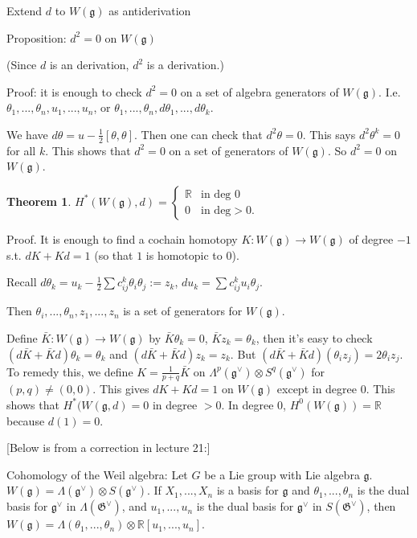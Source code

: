 \documentclass{article}
\theoremstyle{mystyle}
\newtheorem*{theorem*}{Theorem}
\theoremstyle{remark}
\numberwithin{equation}{section}
\begin{document}
Extend $d$ to $W(\mathfrak{g})$ as antiderivation

Proposition: $d^2=0$ on $W(\mathfrak{g})$

(Since $d$ is an derivation, $d^2$ is a derivation.)

Proof: it is enough to check $d^2=0$ on a set of algebra generators of $W(\mathfrak{g})$. I.e. $\theta_1,...,\theta_n,u_1,...,u_n$, or $\theta_1,...,\theta_n,d\theta_1,...,d\theta_k$. 

We have $d\theta = u - \frac{1}{2}[\theta,\theta]$. Then one can check that $d^2\theta = 0$. This says $d^2\theta^k=0$ for all $k$. This shows that $d^2 =0$ on a set of generators of $W(\mathfrak{g})$. So $d^2=0$ on $W(\mathfrak{g})$. 


\begin{theorem*}
$H^*(W(\mathfrak{g}),d) = \left\{\begin{array}{ll} \mathbb{R} & \text{in deg }0\\
0 & \text{in deg}>0.\end{array}\right.$
\end{theorem*}

Proof. It is enough to find a cochain homotopy $K\colon W(\mathfrak{g}) \rightarrow W(\mathfrak{g})$ of degree $-1$ s.t. $dK + Kd = 1$ (so that $1$ is homotopic to $0$). 

Recall $d\theta_k = u_k - \frac{1}{2} \sum c^k_{ij} \theta_i \theta_j:=z_k$, $du_k = \sum c^k_{ij} u_i \theta_j$. 

Then $\theta_i,...,\theta_n,z_1,...,z_n$ is a set of generators for $W(\mathfrak{g})$. 

Define $\bar{K}\colon W(\mathfrak{g})\rightarrow W(\mathfrak{g})$ by $\bar{K}\theta_k=0$, $\bar{K}z_k = \theta_k$, then it's easy to check $(d\bar{K}+\bar{K}d)\theta_k = \theta_k$ and $(d\bar{K}+\bar{K}d)z_k = z_k$. But $(d\bar{K}+\bar{K}d)(\theta_iz_j) = 2\theta_iz_j$. To remedy this, we define $K = \frac{1}{p+q} \bar{K}$ on $\Lambda^p(\mathfrak{g}^\vee)\otimes S^q(\mathfrak{g}^\vee)$ for $(p,q)\neq (0,0)$.  This gives $dK+Kd = 1$ on $W(\mathfrak{g}) $ except in degree 0. This shows that $H^*(W(\mathfrak{g},d)=0$ in degree $>0$. In degree 0, $H^0(W(\mathfrak{g})) = \mathbb{R}$ because $d(1) = 0$.

[Below is from a correction in lecture 21:]

Cohomology of the Weil algebra: Let $G$ be a Lie group with Lie algebra $\mathfrak{g}$. $W(\mathfrak{g}) = \Lambda(\mathfrak{g}^\vee)\otimes S(\mathfrak{g}^\vee)$. If $X_1,...,X_n$ is a basis for $\mathfrak{g}$ and $\theta_1,...,\theta_n$ is the dual basis for $\mathfrak{g}^\vee$ in $\Lambda(\mathfrak{G}^\vee)$, and $u_1,...,u_n$ is the dual basis for $\mathfrak{g}^\vee$ in $S(\mathfrak{G}^\vee)$, then $W(\mathfrak{g}) = \Lambda(\theta_1,...,\theta_n)\otimes \mathbb{R}[u_1,...,u_n]$.
\end{document}
